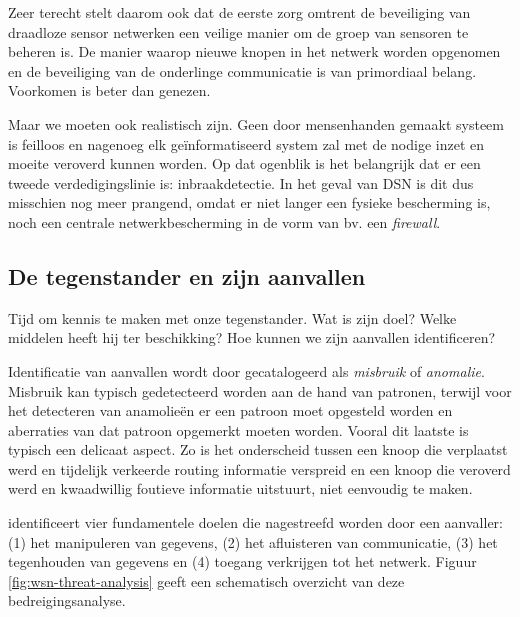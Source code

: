 Zeer terecht stelt \citep{perrig2004security} daarom ook dat de eerste zorg
omtrent de beveiliging van draadloze sensor netwerken een veilige manier om de
groep van sensoren te beheren is. De manier waarop nieuwe knopen in het netwerk
worden opgenomen en de beveiliging van de onderlinge communicatie is van
primordiaal belang. Voorkomen is beter dan genezen.

Maar we moeten ook realistisch zijn. Geen door mensenhanden gemaakt systeem is
feilloos en nagenoeg elk ge\"informatiseerd system zal met de nodige inzet en
moeite veroverd kunnen worden. Op dat ogenblik is het belangrijk dat er een
tweede verdedigingslinie is: inbraakdetectie. In het geval van DSN is dit dus
misschien nog meer prangend, omdat er niet langer een fysieke bescherming is,
noch een centrale netwerkbescherming in de vorm van bv. een \emph{firewall}.

\subsection{De tegenstander en zijn aanvallen}

Tijd om kennis te maken met onze tegenstander. Wat is zijn doel? Welke middelen
heeft hij ter beschikking? Hoe kunnen we zijn aanvallen identificeren?

Identificatie van aanvallen wordt door \citep{zhang2000intrusion} gecatalogeerd
als \emph{misbruik} of \emph{anomalie}. Misbruik kan typisch gedetecteerd
worden aan de hand van patronen, terwijl voor het detecteren van anamolie\"en
er een patroon moet opgesteld worden en aberraties van dat patroon opgemerkt
moeten worden. Vooral dit laatste is typisch een delicaat aspect. Zo is het
onderscheid tussen een knoop die verplaatst werd en tijdelijk verkeerde routing
informatie verspreid en een knoop die veroverd werd en kwaadwillig foutieve
informatie uitstuurt, niet eenvoudig te maken.

\citep{aschenbruck2012security} identificeert vier fundamentele doelen die
nagestreefd worden door een aanvaller: (1) het manipuleren van gegevens, (2)
het afluisteren van communicatie, (3) het tegenhouden van gegevens en (4)
toegang verkrijgen tot het netwerk. Figuur \ref{fig:wsn-threat-analysis} geeft
een schematisch overzicht van deze bedreigingsanalyse.

